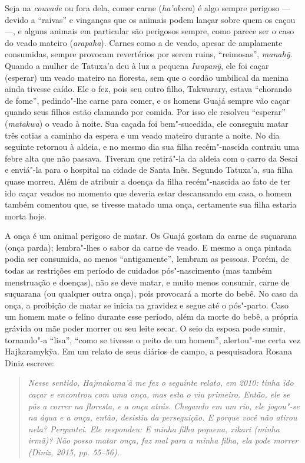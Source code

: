 Seja na \emph{couvade} ou fora dela, comer carne (\emph{ha'okera}) é
algo sempre perigoso --- devido a ``raivas'' e vinganças que os animais
podem lançar sobre quem os caçou ---, e alguns animais em particular são
perigosos sempre, como parece ser o caso do veado mateiro
(\emph{arapaha}). Carnes como a de veado, apesar de amplamente
consumidas, sempre provocam revertérios por serem ruins, ``reimosas'',
\emph{manahỹ}. Quando a mulher de Tatuxa'a deu à luz a pequena
\emph{Iwapanỹ}, ele foi caçar (esperar) um veado mateiro na floresta,
sem que o cordão umbilical da menina ainda tivesse caído. Ele o fez,
pois seu outro filho, Takwarary, estava ``chorando de fome'', pedindo"-lhe
carne para comer, e os homens Guajá sempre vão caçar quando seus filhos
estão clamando por comida. Por isso ele resolveu ``esperar''
(\emph{matakwa}) o veado à noite. Sua caçada foi bem"-sucedida, ele
conseguiu matar três cotias a caminho da espera e um veado mateiro
durante a noite. No dia seguinte retornou à aldeia, e no mesmo dia sua
filha recém"-nascida contraiu uma febre alta que não passava. Tiveram que
retirá"-la da aldeia com o carro da Sesai e enviá"-la para o hospital na
cidade de Santa Inês. Segundo Tatuxa'a, sua filha quase morreu. Além de
atribuir a doença da filha recém"-nascida ao fato de ter ido caçar veados
no momento que deveria estar descansando em casa, o homem também
comentou que, se tivesse matado uma onça, certamente sua filha estaria
morta hoje.

A onça é um animal perigoso de matar. Os Guajá gostam da carne de
suçuarana (onça parda); lembra"-lhes o sabor da carne de veado. E mesmo a
onça pintada podia ser consumida, ao menos ``antigamente'', lembram as
pessoas. Porém, de todas as restrições em período de cuidados
pós"-nascimento (mas também menstruação e doenças), não se deve matar, e
muito menos consumir, carne de suçuarana (ou qualquer outra onça), pois
provocará a morte do bebê. No caso da onça, a proibição de matar se
inicia na gravidez e segue até o pós"-parto. Caso um homem mate o felino
durante esse período, além da morte do bebê, a própria grávida ou mãe
poder morrer ou seu leite secar. O seio da esposa pode sumir, tornando"-a
``lisa'', ``como se tivesse o peito de um homem'', alertou"-me certa vez
Hajkaramykỹa. Em um relato de seus diários de campo, a pesquisadora Rosana Diniz escreve:

\begin{quote}
\emph{Nesse sentido, Hajmakoma'ã me fez o seguinte relato, em 2010: tinha ido
caçar e encontrou com uma onça, mas esta o viu primeiro. Então, ele se
pôs a correr na floresta, e a onça atrás. Chegando em um rio, ele
jogou"-se na água e a onça, então, desistiu da perseguição. E porque você
não atirou nela? Perguntei. Ele respondeu: E minha filha pequena,
\emph{xikari} (minha irmã)? Não posso matar onça, faz mal para a minha
filha, ela pode morrer (Diniz, 2015, pp. 55--56).}
\end{quote}

